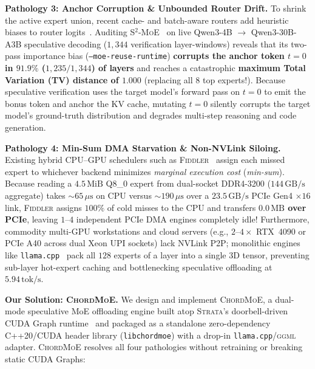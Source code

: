\documentclass[10pt,twocolumn]{article}
\theoremstyle{definition}
\begin{document}
\vspace{2pt}
\noindent\textbf{Pathology 3: Anchor Corruption \& Unbounded Router Drift.}
To shrink the active expert union, recent cache- and batch-aware routers add heuristic biases to router logits~\cite{s2moe2026,zhong2024adapmoe}. Auditing \textsc{S$^2$-MoE}~\cite{s2moe2026} on live Qwen3-4B $\to$ Qwen3-30B-A3B speculative decoding ($1,344$ verification layer-windows) reveals that its two-pass importance bias (\texttt{--moe-reuse-runtime}) \textbf{corrupts the anchor token $t=0$ in $91.9\%$ ($1,235/1,344$) of layers} and reaches a catastrophic \textbf{maximum Total Variation (TV) distance of $1.000$} (replacing all $8$ top experts!). Because speculative verification uses the target model's forward pass on $t=0$ to emit the bonus token and anchor the KV cache, mutating $t=0$ silently corrupts the target model's ground-truth distribution and degrades multi-step reasoning and code generation.

\vspace{2pt}
\noindent\textbf{Pathology 4: Min-Sum DMA Starvation \& Non-NVLink Siloing.}
Existing hybrid CPU--GPU schedulers such as \textsc{Fiddler}~\cite{kamahori2025fiddler} assign each missed expert to whichever backend minimizes \emph{marginal execution cost} (\emph{min-sum}). Because reading a $4.5\,\text{MiB}$ Q8\_0 expert from dual-socket DDR4-3200 ($144\,\text{GB/s}$ aggregate) takes $\sim\!65\,\mu\text{s}$ on CPU versus $\sim\!190\,\mu\text{s}$ over a $23.5\,\text{GB/s}$ PCIe Gen4 $\times 16$ link, \textsc{Fiddler} assigns $100\%$ of cold misses to the CPU and transfers \textbf{$0.0\,\text{MB}$ over PCIe}, leaving $1\text{--}4$ independent PCIe DMA engines completely idle! Furthermore, commodity multi-GPU workstations and cloud servers (e.g., $2\text{--}4\times$ RTX~4090 or PCIe A40 across dual Xeon UPI sockets) lack NVLink P2P; monolithic engines like \texttt{llama.cpp}~\cite{llamacpp} pack all $128$ experts of a layer into a single 3D tensor, preventing sub-layer hot-expert caching and bottlenecking speculative offloading at $5.94\,\text{tok/s}$.

\vspace{3pt}
\noindent\textbf{Our Solution: \textsc{ChordMoE}.}
We design and implement \textsc{ChordMoE}, a dual-mode speculative MoE offloading engine built atop \textsc{Strata}'s doorbell-driven CUDA Graph runtime~\cite{strata2026} and packaged as a standalone zero-dependency C++20/CUDA header library (\texttt{libchordmoe}) with a drop-in \texttt{llama.cpp}/\textsc{ggml} adapter. \textsc{ChordMoE} resolves all four pathologies without retraining or breaking static CUDA Graphs:
\end{document}
